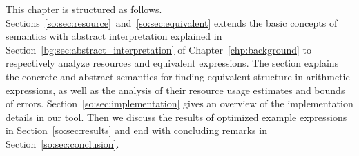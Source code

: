 This chapter is structured as follows.
Sections~\ref{so:sec:resource}~and~\ref{so:sec:equivalent} extends the
basic concepts of semantics with abstract interpretation explained in
Section~\ref{bg:sec:abstract_interpretation} of Chapter~\ref{chp:background}
to respectively analyze resources and equivalent expressions.  The section
explains the concrete and abstract semantics for finding equivalent structure
in arithmetic expressions, as well as the analysis of their resource usage
estimates and bounds of errors.  Section~\ref{so:sec:implementation} gives an
overview of the implementation details in our tool. Then we discuss the results
of optimized example expressions in Section~\ref{so:sec:results} and end with
concluding remarks in Section~\ref{so:sec:conclusion}.
